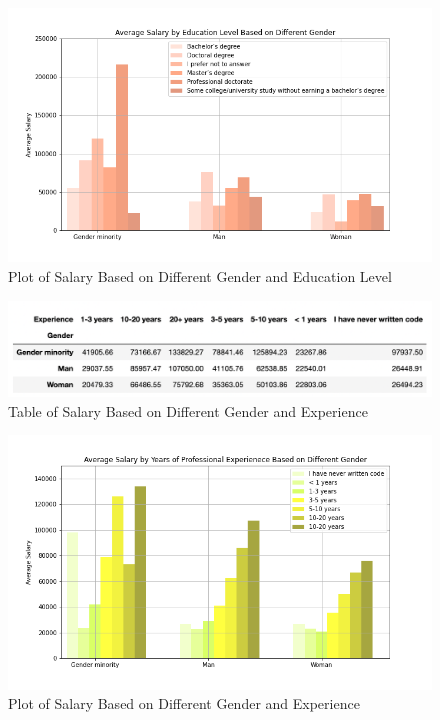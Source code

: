 \documentclass[10pt,onecolumn,letterpaper]{article}
\begin{document}
\begin{figure}[htbp]
  \centering
  \includegraphics[width=1\textwidth]{f6.png}
  \caption{Plot of Salary Based on Different Gender and Education Level}
\end{figure}

\begin{figure}[htbp]
  \centering
  \includegraphics[width=1\textwidth]{f7.png}
  \caption{Table of Salary Based on Different Gender and Experience}
\end{figure}

\begin{figure}[htbp]
  \centering
  \includegraphics[width=1\textwidth]{f8.png}
  \caption{Plot of Salary Based on Different Gender and Experience}
\end{figure}
\end{document}
